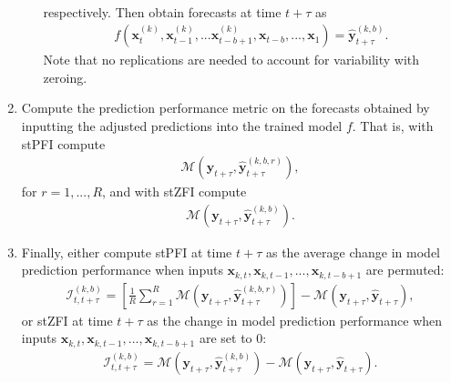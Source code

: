 \documentclass[AMS,STIX2COL]{WileyNJD-v2}
\begin{document}
\begin{enumerate}
\begin{enumerate}
\begin{align}
        \end{align}
        respectively. Then obtain forecasts at time $t+\tau$ as 
        \begin{align}
            f\left(\textbf{x}^{(k)}_t, \textbf{x}^{(k)}_{t-1},... \textbf{x}^{(k)}_{t-b+1}, \textbf{x}_{t-b},...,\textbf{x}_1\right)=\hat{\textbf{y}}^{(k,b)}_{t+\tau}.
        \end{align}
        Note that no replications are needed to account for variability with zeroing. 
    \end{enumerate}
    \item Compute the prediction performance metric on the forecasts obtained by inputting the adjusted predictions into the trained model $f$. That is, with stPFI compute
    \begin{align}
        \mathcal{M}\left(\textbf{y}_{t+\tau}, \hat{\textbf{y}}^{(k,b,r)}_{t+\tau}\right),
    \end{align}
    for $r=1,...,R$, and with stZFI compute
    \begin{align}
        \mathcal{M}\left(\textbf{y}_{t+\tau}, \hat{\textbf{y}}^{(k,b)}_{t+\tau}\right).
    \end{align}
    \item Finally, either compute stPFI at time $t+\tau$ as the average change in model prediction performance when inputs $\textbf{x}_{k,t}, \textbf{x}_{k,t-1},..., \textbf{x}_{k,t-b+1}$ are permuted:
    \begin{align}
        \mathcal{I}^{(k,b)}_{t,t+\tau}=\left[\frac{1}{R}\sum_{r=1}^R\mathcal{M}\left(\textbf{y}_{t+\tau}, \hat{\textbf{y}}^{(k,b,r)}_{t+\tau}\right)\right] - \mathcal{M}\left(\textbf{y}_{t+\tau}, \hat{\textbf{y}}_{t+\tau}\right),
    \end{align}
    or stZFI at time $t+\tau$ as the change in model prediction performance when inputs $\textbf{x}_{k,t}, \textbf{x}_{k,t-1},..., \textbf{x}_{k,t-b+1}$ are set to 0:
    \begin{align}
        \mathcal{I}^{(k,b)}_{t,t+\tau}=\mathcal{M}\left(\textbf{y}_{t+\tau}, \hat{\textbf{y}}^{(k,b)}_{t+\tau}\right) - \mathcal{M}\left(\textbf{y}_{t+\tau}, \hat{\textbf{y}}_{t+\tau}\right).
    \end{align}
\end{enumerate}
\end{document}
